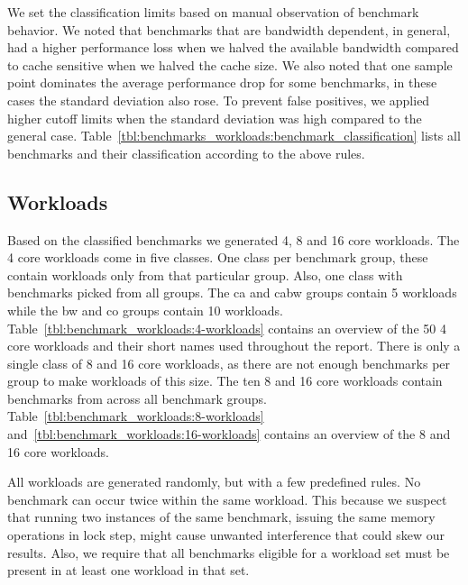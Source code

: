 We set the classification limits based on manual observation of benchmark behavior. 
We noted that benchmarks that are bandwidth dependent, in general, had a higher performance loss when we halved the available bandwidth compared to cache sensitive when we halved the cache size.
We also noted that one sample point dominates the average performance drop for some benchmarks, in these cases the standard deviation also rose. 
To prevent false positives, we applied higher cutoff limits when the standard deviation was high compared to the general case.
Table~\ref{tbl:benchmarks_workloads:benchmark_classification} lists all benchmarks and their classification according to the above rules.


\subsection{Workloads}
\label{sec:methodology:benchmarks:workloads}

Based on the classified benchmarks we generated 4, 8 and 16 core workloads.
The 4 core workloads come in five classes.
One class per benchmark group, these contain workloads only from that particular group.
Also, one class with benchmarks picked from all groups.
The ca and cabw groups contain 5 workloads while the bw and co groups contain 10 workloads.
Table~\ref{tbl:benchmark_workloads:4-workloads} contains an overview of the 50 4 core workloads and their short names used throughout the report.
There is only a single class of 8 and 16 core workloads, as there are not enough benchmarks per group to make workloads of this size. 
The ten 8 and 16 core workloads contain benchmarks from across all benchmark groups.
Table~\ref{tbl:benchmark_workloads:8-workloads} and~\ref{tbl:benchmark_workloads:16-workloads} contains an overview of the 8 and 16 core workloads.

All workloads are generated randomly, but with a few predefined rules.
No benchmark can occur twice within the same workload.
This because we suspect that running two instances of the same benchmark, issuing the same memory operations in lock step, might cause unwanted interference that could skew our results. 
Also, we require that all benchmarks eligible for a workload set must be present in at least one workload in that set.
